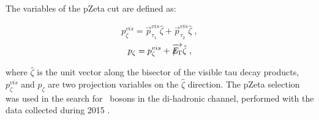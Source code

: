 {\renewcommand{\arraystretch}{1.5}%
\begin{table}[H]
\begin{center}
\end{center}
\caption{Selections considered. \label{tab:EventSelection}}
\end{table}
}
 
\noindent The variables of the pZeta cut are defined as:

\begin{equation}
   p_{\zeta}^{vis} = \overrightarrow{p}_{\tau_{1}}^{vis}\hat{\zeta}+\overrightarrow{p}_{\tau_{2}}^{vis}\hat{\zeta} \; ,
\label{eq:zetavis}
\end{equation}
\begin{equation}
   p_{\zeta} = p_{\zeta}^{vis}+\overrightarrow{{E\!\!\!\!/_{\rm T}}}\hat{\zeta} \; ,
\label{eq:zeta}
\end{equation}

\noindent where $\hat{\zeta}$ is the unit vector along the bisector of the visible tau decay products,
$p_{\zeta}^{vis}$ and $p_{\zeta}$ are two projection variables on the $\hat{\zeta}$ direction. The pZeta 
selection was used in the search for \Zprime~bosons in the di-hadronic channel,
performed with the data collected during 2015 \cite{CMSZprimetotautau2015}. \\

